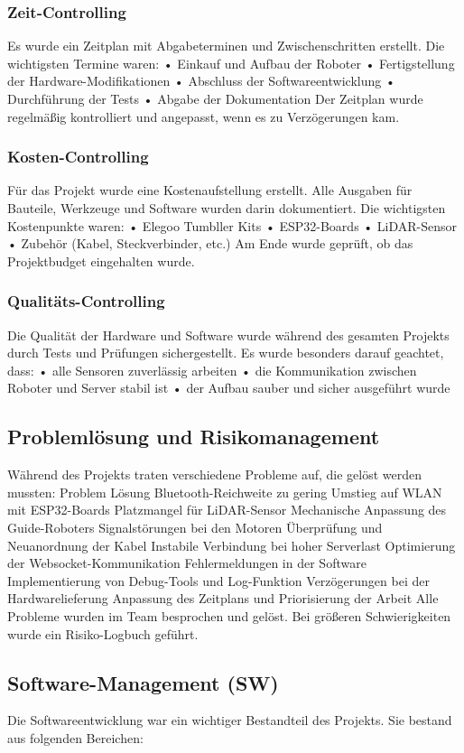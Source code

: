 \subsubsection{Zeit-Controlling}
Es wurde ein Zeitplan mit Abgabeterminen und Zwischenschritten erstellt.
Die wichtigsten Termine waren:
•	Einkauf und Aufbau der Roboter
•	Fertigstellung der Hardware-Modifikationen
•	Abschluss der Softwareentwicklung
•	Durchführung der Tests
•	Abgabe der Dokumentation
Der Zeitplan wurde regelmäßig kontrolliert und angepasst, wenn es zu Verzögerungen kam.
\subsubsection{Kosten-Controlling}
Für das Projekt wurde eine Kostenaufstellung erstellt. Alle Ausgaben für Bauteile, Werkzeuge und Software wurden darin dokumentiert.
Die wichtigsten Kostenpunkte waren:
•	Elegoo Tumbller Kits
•	ESP32-Boards
•	LiDAR-Sensor
•	Zubehör (Kabel, Steckverbinder, etc.)
Am Ende wurde geprüft, ob das Projektbudget eingehalten wurde.
\subsubsection{Qualitäts-Controlling}
Die Qualität der Hardware und Software wurde während des gesamten Projekts durch Tests und Prüfungen sichergestellt.
Es wurde besonders darauf geachtet, dass:
•	alle Sensoren zuverlässig arbeiten
•	die Kommunikation zwischen Roboter und Server stabil ist
•	der Aufbau sauber und sicher ausgeführt wurde
%
\subsection{Problemlösung und Risikomanagement}
%
Während des Projekts traten verschiedene Probleme auf, die gelöst werden mussten:
Problem	Lösung
Bluetooth-Reichweite zu gering	Umstieg auf WLAN mit ESP32-Boards
Platzmangel für LiDAR-Sensor	Mechanische Anpassung des Guide-Roboters
Signalstörungen bei den Motoren	Überprüfung und Neuanordnung der Kabel
Instabile Verbindung bei hoher Serverlast	Optimierung der Websocket-Kommunikation
Fehlermeldungen in der Software	Implementierung von Debug-Tools und Log-Funktion
Verzögerungen bei der Hardwarelieferung	Anpassung des Zeitplans und Priorisierung der Arbeit
Alle Probleme wurden im Team besprochen und gelöst. Bei größeren Schwierigkeiten wurde ein Risiko-Logbuch geführt.
\subsection{Software-Management (SW)}
%
Die Softwareentwicklung war ein wichtiger Bestandteil des Projekts. Sie bestand aus folgenden Bereichen:
